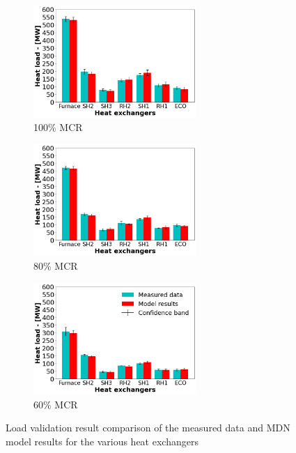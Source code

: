 \documentclass[a4paper,fleqn]{cas-sc}
\begin{document}
\begin{figure}[h!]
\centering
\begin{subfigure}{0.33\textwidth}
    \includegraphics[width=\textwidth, height = 4.25cm]{100_CASE}
    \caption{100\% MCR}
\end{subfigure}\hfill %
\begin{subfigure}{0.33\textwidth}
    \includegraphics[width=\linewidth, height = 4.25cm]{80_CASE}
    \caption{80\% MCR}
\end{subfigure}\hfill
\begin{subfigure}{0.33\textwidth}
	\includegraphics[width=\linewidth, height = 4.25cm]{60_CASE}
        \caption{60\% MCR}
\end{subfigure}
\caption{Load validation result comparison of the measured data and MDN model results for the various heat exchangers}
\label{fig_heat_load}
\end{figure}
\end{document}
